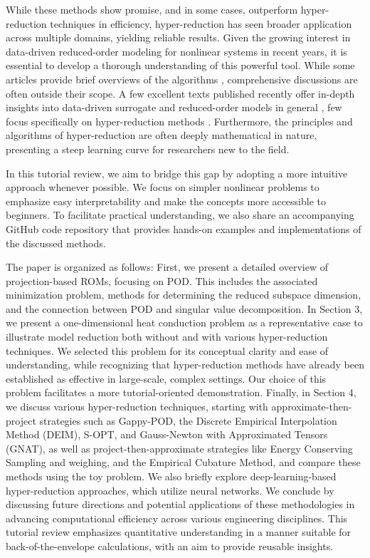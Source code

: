 \documentclass[11pt]{article}
\begin{document}
    While these methods show promise, and in some cases, outperform hyper-reduction techniques in efficiency, hyper-reduction has seen broader application across multiple domains, yielding reliable results.
    Given the growing interest in data-driven reduced-order modeling for nonlinear systems in recent years, it is essential to develop a thorough understanding of this powerful tool.
    While some articles provide brief overviews of the algorithms \cite{kim2021improved}, comprehensive discussions are often outside their scope.
    A few excellent texts published recently offer in-depth insights into data-driven surrogate and reduced-order models in general \cite{benner_2021,brunton2019data-driven,ghattas2021learning,fu2018pod}, few focus specifically on hyper-reduction methods \cite{Nguyen2024}.
    Furthermore, the principles and algorithms of hyper-reduction are often deeply mathematical in nature, presenting a steep learning curve for researchers new to the field.


    In this tutorial review, we aim to bridge this gap by adopting a more intuitive approach whenever possible.
    We focus on simpler nonlinear problems to emphasize easy interpretability and make the concepts more accessible to beginners.
    To facilitate practical understanding, we also share an accompanying GitHub code repository that provides hands-on examples and implementations of the discussed methods.


    The paper is organized as follows: First,%
    we present a detailed overview of projection-based ROMs, focusing on POD.
    This includes the associated minimization problem, methods for determining the reduced subspace dimension, and the connection between POD and singular value decomposition.
    In Section 3, we present a one-dimensional heat conduction problem as a representative case to illustrate model reduction both without and with various hyper-reduction techniques.
    We selected this problem for its conceptual clarity and ease of understanding, while recognizing that hyper-reduction methods have already been established as effective in large-scale, complex settings.
    Our choice of this problem facilitates a more tutorial-oriented demonstration.
    Finally, in Section 4, we discuss various hyper-reduction techniques, starting with approximate-then-project strategies such as Gappy-POD, the Discrete Empirical Interpolation Method (DEIM), S-OPT, and Gauss-Newton with Approximated Tensors (GNAT), as well as project-then-approximate strategies like Energy Conserving Sampling and weighing, and the Empirical Cubature Method, and compare these methods using the toy problem.
    We also briefly explore deep-learning-based hyper-reduction approaches, which utilize neural networks.
    We conclude by discussing future directions and potential applications of these methodologies in advancing computational efficiency across various engineering disciplines.
    This tutorial review emphasizes quantitative understanding in a manner suitable for back-of-the-envelope calculations, with an aim to provide reusable insights.
\end{document}
